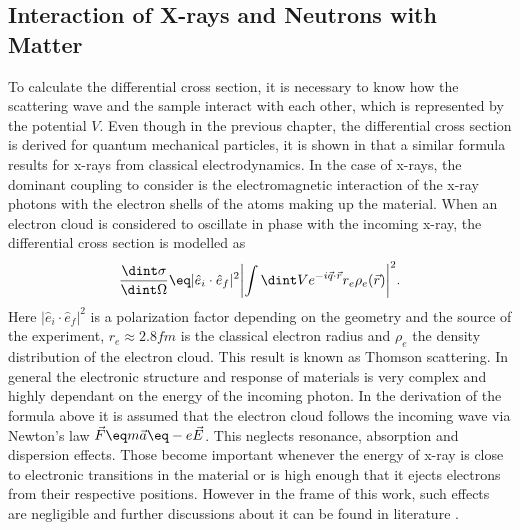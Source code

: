 \documentclass[\main/dresen_thesis.tex]{subfiles}
\begin{document}
\subsection{Interaction of X-rays and Neutrons with Matter}\label{sec:theoreticalBackground:scattering:interactionWithMatter}
To calculate the differential cross section, it is necessary to know how the scattering wave and the sample interact with each other, which is represented by the potential $V$.
Even though in the previous chapter, the differential cross section is derived for quantum mechanical particles, it is shown in  that a similar formula results for x-rays from classical electrodynamics.
In the case of x-rays, the dominant coupling to consider is the electromagnetic interaction of the x-ray photons with the electron shells of the atoms making up the material.
When an electron cloud is considered to oscillate in phase with the incoming x-ray, the differential cross section is modelled as
\begin{align}
  \frac{\dint \sigma}{\dint \Omega} \eq |\hat{e}_i \cdot \hat{e}_f|^2 \biggl| \int \dint V e^{-i \vec{q} \cdot \vec{r}}  r_e \rho_e (\vec{r}) \biggr|^2.
\end{align}
Here $|\hat{e}_i \cdot \hat{e}_f|^2$ is a polarization factor depending on the geometry and the source of the experiment, $r_e \approx 2.8 \unit{fm}$ is the classical electron radius and $\rho_e$ the density distribution of the electron cloud.
This result is known as Thomson scattering.
In general the electronic structure and response of materials is very complex and highly dependant on the energy of the incoming photon.
In the derivation of the formula above it is assumed that the electron cloud follows the incoming wave via Newton's law $\vec{F} \eq m \vec{a} \eq -e\vec{E}$.
This neglects resonance, absorption and dispersion effects.
Those become important whenever the energy of x-ray is close to electronic transitions in the material or is high enough that it  ejects electrons from their respective positions.
However in the frame of this work, such effects are negligible and further discussions about it can be found in literature \cite{AlsNielsen_2011_Eleme}.
\end{document}
